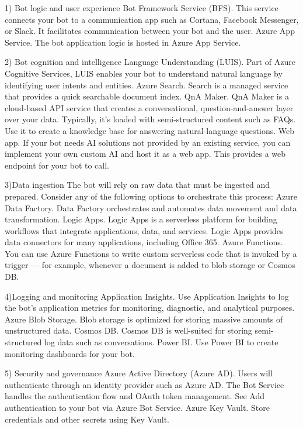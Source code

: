 \documentclass[9pt,software]{livecoms}
\begin{document}
1) Bot logic and user experience
Bot Framework Service (BFS). This service connects your bot to a communication app such as Cortana, Facebook Messenger, or Slack. It facilitates communication between your bot and the user.
Azure App Service. The bot application logic is hosted in Azure App Service.

2) Bot cognition and intelligence
Language Understanding (LUIS). Part of Azure Cognitive Services, LUIS enables your bot to understand natural language by identifying user intents and entities.
Azure Search. Search is a managed service that provides a quick searchable document index.
QnA Maker. QnA Maker is a cloud-based API service that creates a conversational, question-and-answer layer over your data. Typically, it's loaded with semi-structured content such as FAQs. Use it to create a knowledge base for answering natural-language questions.
Web app. If your bot needs AI solutions not provided by an existing service, you can implement your own custom AI and host it as a web app. This provides a web endpoint for your bot to call.

3)Data ingestion
The bot will rely on raw data that must be ingested and prepared. Consider any of the following options to orchestrate this process:
Azure Data Factory. Data Factory orchestrates and automates data movement and data transformation.
Logic Apps. Logic Apps is a serverless platform for building workflows that integrate applications, data, and services. Logic Apps provides data connectors for many applications, including Office 365.
Azure Functions. You can use Azure Functions to write custom serverless code that is invoked by a trigger — for example, whenever a document is added to blob storage or Cosmos DB.

4)Logging and monitoring
Application Insights. Use Application Insights to log the bot's application metrics for monitoring, diagnostic, and analytical purposes.
Azure Blob Storage. Blob storage is optimized for storing massive amounts of unstructured data.
Cosmos DB. Cosmos DB is well-suited for storing semi-structured log data such as conversations.
Power BI. Use Power BI to create monitoring dashboards for your bot.

5) Security and governance
Azure Active Directory (Azure AD). Users will authenticate through an identity provider such as Azure AD. The Bot Service handles the authentication flow and OAuth token management. See Add authentication to your bot via Azure Bot Service.
Azure Key Vault. Store credentials and other secrets using Key Vault.
\end{document}
